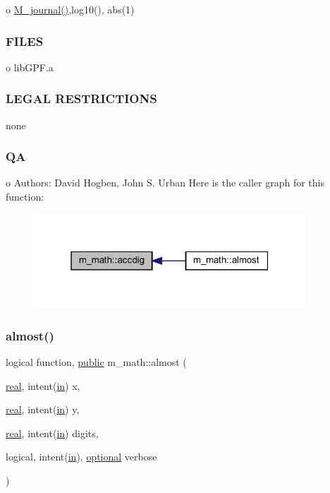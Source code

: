 o \hyperlink{M__journal_83_8txt_aba3a4e3e5bac44e7e807c3472bb2af91}{M\+\_\+journal()},log10(), abs(1)

\subsubsection*{F\+I\+L\+ES}

o lib\+G\+P\+F.\+a \subsubsection*{L\+E\+G\+AL R\+E\+S\+T\+R\+I\+C\+T\+I\+O\+NS}

none \subsubsection*{QA}

o Authors\+: David Hogben, John S. Urban Here is the caller graph for this function\+:
\nopagebreak
\begin{figure}[H]
\begin{center}
\leavevmode
\includegraphics[width=289pt]{namespacem__math_a29d92d203eee5fb3ccf5fee7abce7450_icgraph}
\end{center}
\end{figure}
\mbox{\label{namespacem__math_a5c6526b86e62cffde2dc20e53fd3be22}} 
\subsubsection{\texorpdfstring{almost()}{almost()}}
{\footnotesize\ttfamily logical function, \hyperlink{M__stopwatch_83_8txt_a2f74811300c361e53b430611a7d1769f}{public} m\+\_\+math\+::almost (\begin{DoxyParamCaption}\item[{\hyperlink{read__watch_83_8txt_abdb62bde002f38ef75f810d3a905a823}{real}, intent(\hyperlink{M__journal_83_8txt_afce72651d1eed785a2132bee863b2f38}{in})}]{x,  }\item[{\hyperlink{read__watch_83_8txt_abdb62bde002f38ef75f810d3a905a823}{real}, intent(\hyperlink{M__journal_83_8txt_afce72651d1eed785a2132bee863b2f38}{in})}]{y,  }\item[{\hyperlink{read__watch_83_8txt_abdb62bde002f38ef75f810d3a905a823}{real}, intent(\hyperlink{M__journal_83_8txt_afce72651d1eed785a2132bee863b2f38}{in})}]{digits,  }\item[{logical, intent(\hyperlink{M__journal_83_8txt_afce72651d1eed785a2132bee863b2f38}{in}), \hyperlink{option__stopwatch_83_8txt_aa4ece75e7acf58a4843f70fe18c3ade5}{optional}}]{verbose }\end{DoxyParamCaption})}



